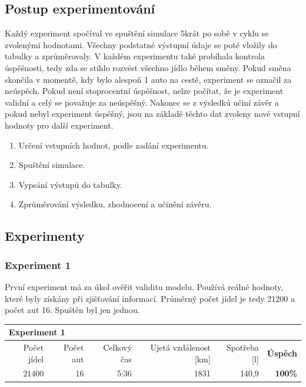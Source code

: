 \documentclass[a4paper, 11pt]{article}
\begin{document}
	\subsection{Postup experimentování}

	Každý experiment spočíval ve spuštění simulace 5krát po sobě v cyklu se 
	zvolenými hodnotami. Všechny podstatné výstupní údaje se poté vložily do 
	tabulky a zprůměrovaly. V každém experimentu také probíhala kontrola 
	úspěšnosti, tedy zda se stihlo rozvést všechno jídlo během směny. Pokud
	směna skončila v momentě, kdy bylo alespoň 1 auto na cestě, experiment se
	označil za neúspěch. Pokud není stoprocentní úspěšnost, nelze počítat, 
	že je experiment validní a celý se považuje za neúspěšný. Nakonec se z
	výsledků učiní závěr a pokud nebyl experiment úspěšný, jsou na základě
	těchto dat zvoleny nové vstupní hodnoty pro další experiment.


	\begin{enumerate}
		\item Určení vstupních hodnot, podle zadání experimentu.

		\item Spuštění simulace.

		\item Vypsání výstupů do tabulky. 

		\item Zprůměrování výsledku, zhodnocení a učinění závěru.

	\end{enumerate}
	\subsection{Experimenty}

	\subsubsection{Experiment 1}

	První experiment má za úkol ověřit validitu modelu. Používá reálné hodnoty, 
	které byly získány při zjišťování informací. Průměrný počet jídel je tedy
	21200 a počet aut 16. Spuštěn byl jen jednou.

	\begin{table}[h!]
		\centering
		\begin{tabular}{|r|r|r|r|r|r|}
			\hline
			\multicolumn{6}{|l|}{\textbf{Experiment 1}}   \\ \hline
			 Počet jídel & Počet aut & Celkový čas & Ujetá vzdálenost [km] & Spotřeba [l] & \textbf{Úspěch} \\ \hline
			 21400 & 16 & 5:36 & 1831 & 140,9 & \textbf{100\%} \\ \hline
		\end{tabular}
	\end{table}
\end{document}
